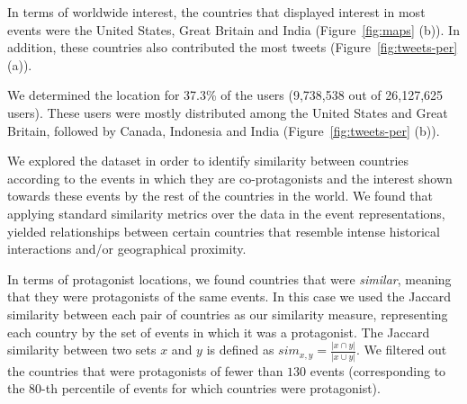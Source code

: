 
In terms of worldwide interest, the countries that displayed interest in most
events were the United States, Great Britain and India (Figure~\ref{fig:maps}
(b)).  
%
In addition, these countries also contributed the most tweets
(Figure~\ref{fig:tweets-per} (a)).

We determined the location for 37.3\% of the users (9,738,538 out of 26,127,625
users). 
%
These users were mostly distributed among the United States and Great Britain,
followed by Canada, Indonesia and India (Figure~\ref{fig:tweets-per} (b)).

\medskip
{}
We explored the dataset in order to identify similarity between countries
according to the events in which they are co-protagonists and the interest shown
towards these events by the rest of the countries in the world. 
%
We found that applying standard similarity metrics over the data in the event
representations, yielded relationships between certain countries that resemble
intense historical interactions and/or geographical proximity.

In terms of protagonist locations, we found countries that were {\em similar},
meaning that they were protagonists of the same events. 
%
In this case we used the Jaccard similarity between each pair of countries as
our similarity measure, representing each country by the set of events in which
it was a protagonist. 
%
The Jaccard similarity between two sets $x$ and $y$ is defined as $sim_{x, y} =
\frac{|x \cap y|}{|x \cup y|}$.
%
We filtered out the countries that were protagonists of fewer than $130$ events
(corresponding to the 80-th percentile of events for which countries were
protagonist). \\

%
